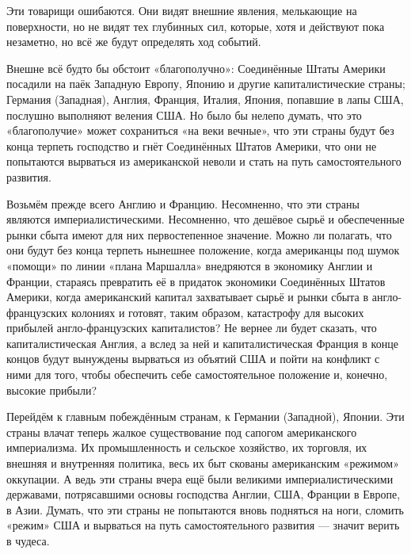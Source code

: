 \documentclass[12pt, a4paper, openany]{book}
\begin{document}
Эти товарищи ошибаются. Они видят внешние явления, мелькающие на поверхности, но не видят тех глубинных сил, которые, хотя и действуют пока незаметно, но всё же будут определять ход событий.



Внешне всё будто бы обстоит «благополучно»: Соединённые Штаты Америки посадили на паёк Западную Европу, Японию и другие капиталистические страны; Германия (Западная), Англия, Франция, Италия, Япония, попавшие в лапы США, послушно выполняют веления США. Но было бы нелепо думать, что это «благополучие» может сохраниться «на веки вечные», что эти страны будут без конца терпеть господство и гнёт Соединённых Штатов Америки, что они не попытаются вырваться из американской неволи и стать на путь самостоятельного развития.



Возьмём прежде всего Англию и Францию. Несомненно, что эти страны являются империалистическими. Несомненно, что дешёвое сырьё и обеспеченные рынки сбыта имеют для них первостепенное значение. Можно ли полагать, что они будут без конца терпеть нынешнее положение, когда американцы под шумок «помощи» по линии «плана Маршалла» внедряются в экономику Англии и Франции, стараясь превратить её в придаток экономики Соединённых Штатов Америки, когда американский капитал захватывает сырьё и рынки сбыта в англо-французских колониях и готовят, таким образом, катастрофу для высоких прибылей англо-французских капиталистов? Не вернее ли будет сказать, что капиталистическая Англия, а вслед за ней и капиталистическая Франция в конце концов будут вынуждены вырваться из объятий США и пойти на конфликт с ними для того, чтобы обеспечить себе самостоятельное положение и, конечно, высокие прибыли?



Перейдём к главным побеждённым странам, к Германии (Западной), Японии. Эти страны влачат теперь жалкое существование под сапогом американского империализма. Их промышленность и сельское хозяйство, их торговля, их внешняя и внутренняя политика, весь их быт скованы американским «режимом» оккупации. А ведь эти страны вчера ещё были великими империалистическими державами, потрясавшими основы господства Англии, США, Франции в Европе, в Азии. Думать, что эти страны не попытаются вновь подняться на ноги, сломить «режим» США и вырваться на путь самостоятельного развития — значит верить в чудеса.
\end{document}
